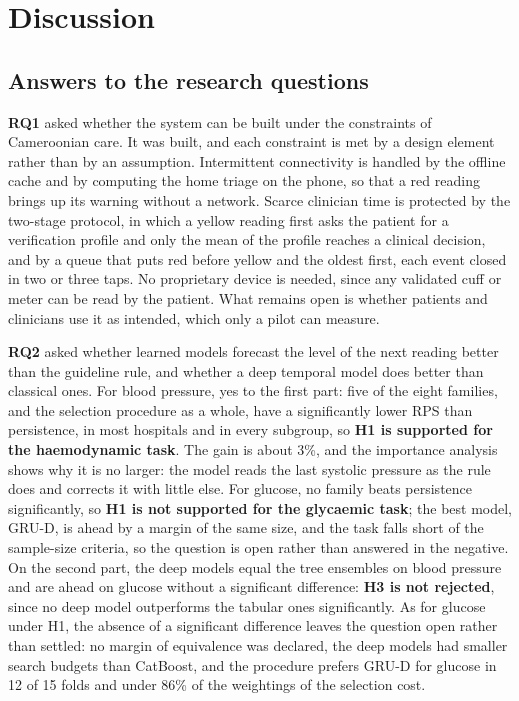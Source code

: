 \section{Discussion}\label{sec:discussion}

\subsection{Answers to the research questions}

\textbf{RQ1} asked whether the system can be built under the constraints of Cameroonian care. It was built, and each constraint is met by a design element rather than by an assumption. Intermittent connectivity is handled by the offline cache and by computing the home triage on the phone, so that a red reading brings up its warning without a network. Scarce clinician time is protected by the two-stage protocol, in which a yellow reading first asks the patient for a verification profile and only the mean of the profile reaches a clinical decision, and by a queue that puts red before yellow and the oldest first, each event closed in two or three taps. No proprietary device is needed, since any validated cuff or meter can be read by the patient. What remains open is whether patients and clinicians use it as intended, which only a pilot can measure.

\textbf{RQ2} asked whether learned models forecast the level of the next reading better than the guideline rule, and whether a deep temporal model does better than classical ones. For blood pressure, yes to the first part: five of the eight families, and the selection procedure as a whole, have a significantly lower RPS than persistence, in most hospitals and in every subgroup, so \textbf{H1 is supported for the haemodynamic task}. The gain is about 3\%, and the importance analysis shows why it is no larger: the model reads the last systolic pressure as the rule does and corrects it with little else. For glucose, no family beats persistence significantly, so \textbf{H1 is not supported for the glycaemic task}; the best model, GRU-D, is ahead by a margin of the same size, and the task falls short of the sample-size criteria, so the question is open rather than answered in the negative. On the second part, the deep models equal the tree ensembles on blood pressure and are ahead on glucose without a significant difference: \textbf{H3 is not rejected}, since no deep model outperforms the tabular ones significantly. As for glucose under H1, the absence of a significant difference leaves the question open rather than settled: no margin of equivalence was declared, the deep models had smaller search budgets than CatBoost, and the procedure prefers GRU-D for glucose in 12 of 15 folds and under 86\% of the weightings of the selection cost.

